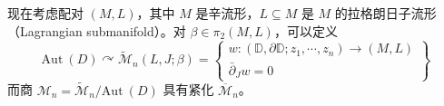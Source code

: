 现在考虑配对 $(M,L)$，其中 $M$ 是辛流形，$L\subseteq M$ 是 $M$ 的拉格朗日子流形（Lagrangian submanifold）。对 $\beta\in\pi_2 (M,L)$，可以定义
\[
\mathrm{Aut}\ (D)\curvearrowright\tilde{\mathcal{M}}_n (L,J;\beta)=\left\{\begin{array}{l}
  w\colon (\mathbb{D},\partial\mathbb{D};z_1,\dotsb, z_n)\to (M,L)\\
  \bar{\partial}_Jw=0
\end{array}\right\}
\]
而商 $\mathcal{M}_n =\tilde{\mathcal{M}}_n/\mathrm{Aut}\ (D)$ 具有紧化 $\overline{\mathcal{M}}_n$。

